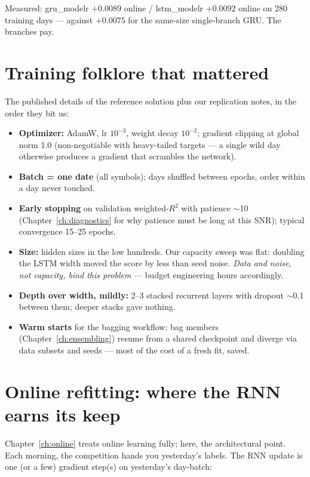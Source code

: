 Measured: gru\_modelr $+0.0089$ online / lstm\_modelr $+0.0092$ online on
280 training days --- against $+0.0075$ for the same-size single-branch
GRU. The branches pay.

\section{Training folklore that mattered}

The published details of the reference solution plus our replication notes,
in the order they bit us:

\begin{itemize}
\item \textbf{Optimizer:} AdamW, lr $10^{-3}$, weight decay $10^{-2}$;
  gradient clipping at global norm 1.0 (non-negotiable with heavy-tailed
  targets --- a single wild day otherwise produces a gradient that
  scrambles the network).
\item \textbf{Batch = one date} (all symbols); days shuffled between
  epochs, order within a day never touched.
\item \textbf{Early stopping} on validation weighted-$R^2$ with patience
  $\sim$10 (Chapter~\ref{ch:diagnostics} for why patience must be long at
  this SNR); typical convergence 15--25 epochs.
\item \textbf{Size:} hidden sizes in the low hundreds. Our capacity
  sweep was flat: doubling the LSTM width moved the score by less than
  seed noise. \emph{Data and noise, not capacity, bind this problem} ---
  budget engineering hours accordingly.
\item \textbf{Depth over width, mildly:} 2--3 stacked recurrent layers
  with dropout $\sim$0.1 between them; deeper stacks gave nothing.
\item \textbf{Warm starts} for the bagging workflow: bag members
  (Chapter~\ref{ch:ensembling}) resume from a shared checkpoint and
  diverge via data subsets and seeds --- most of the cost of a fresh fit,
  saved.
\end{itemize}

\section{Online refitting: where the RNN earns its keep}

Chapter~\ref{ch:online} treats online learning fully; here, the
architectural point. Each morning, the competition hands you yesterday's
labels. The RNN update is one (or a few) gradient step(s) on yesterday's
day-batch:

